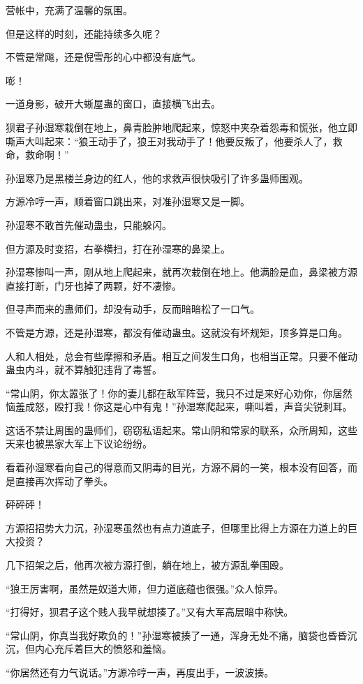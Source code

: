 \begin{this_body}
营帐中，充满了温馨的氛围。

但是这样的时刻，还能持续多久呢？

不管是常飚，还是倪雪彤的心中都没有底气。

嘭！

一道身影，破开大蜥屋蛊的窗口，直接横飞出去。

狈君子孙湿寒栽倒在地上，鼻青脸肿地爬起来，惊怒中夹杂着怨毒和慌张，他立即嘶声大叫起来：“狼王动手了，狼王对我动手了！他要反叛了，他要杀人了，救命，救命啊！”

孙湿寒乃是黑楼兰身边的红人，他的求救声很快吸引了许多蛊师围观。

方源冷哼一声，顺着窗口跳出来，对准孙湿寒又是一脚。

孙湿寒不敢首先催动蛊虫，只能躲闪。

但方源及时变招，右拳横扫，打在孙湿寒的鼻梁上。

孙湿寒惨叫一声，刚从地上爬起来，就再次栽倒在地上。他满脸是血，鼻梁被方源直接打断，门牙也掉了两颗，好不凄惨。

但寻声而来的蛊师们，却没有动手，反而暗暗松了一口气。

不管是方源，还是孙湿寒，都没有催动蛊虫。这就没有坏规矩，顶多算是口角。

人和人相处，总会有些摩擦和矛盾。相互之间发生口角，也相当正常。只要不催动蛊虫内斗，就不算触犯违背了毒誓。

“常山阴，你太嚣张了！你的妻儿都在敌军阵营，我只不过是来好心劝你，你居然恼羞成怒，殴打我！你这是心中有鬼！”孙湿寒爬起来，嘶叫着，声音尖锐刺耳。

这话不禁让周围的蛊师们，窃窃私语起来。常山阴和常家的联系，众所周知，这些天来也被黑家大军上下议论纷纷。

看着孙湿寒看向自己的得意而又阴毒的目光，方源不屑的一笑，根本没有回答，而是直接再次挥动了拳头。

砰砰砰！

方源招招势大力沉，孙湿寒虽然也有点力道底子，但哪里比得上方源在力道上的巨大投资？

几下招架之后，他再次被方源打倒，躺在地上，被方源乱拳围殴。

“狼王厉害啊，虽然是奴道大师，但力道底蕴也很强。”众人惊异。

“打得好，狈君子这个贱人我早就想揍了。”又有大军高层暗中称快。

“常山阴，你真当我好欺负的！”孙湿寒被揍了一通，浑身无处不痛，脑袋也昏昏沉沉，但内心充斥着巨大的愤怒和羞恼。

“你居然还有力气说话。”方源冷哼一声，再度出手，一波波揍。


\end{this_body}
